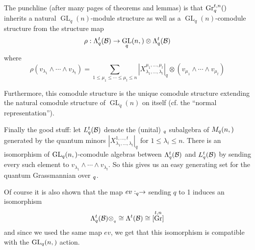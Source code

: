 \documentclass[12pt]{article}
\DeclareMathOperator{\Gr}{Gr}
\DeclareMathOperator{\GL}{GL}
\let\k\relax
\newcommand{\k}{\mathbbm{k}}
\begin{document}
The punchline (after many pages of theorems and lemmas) is that $\Gr_q^{t,n}(\k)$ inherits a natural $\GL_q(n)$-module structure as well as a $\GL_q(n)$-comodule structure 
from the structure map 
\[\rho:\Lambda_q^t(\calB)\to \GL_q(n,\k)\otimes \Lambda_q^t(\calB)\]
where 
\[\rho(v_{\lambda_1}\wedge\cdots\wedge v_{\lambda_t})=\sum_{1\le \mu_1\le\cdots\le \mu_t\le n}|X^{\mu_1,\dots,\mu_t}_{\lambda_1,\dots,\lambda_t}|_q\otimes(v_{\mu_1}\wedge\cdots\wedge v_{\mu_t})\]

Furthermore, this comodule structure is the unique comodule structure extending the natural comodule structure of $\GL_q(n)$ on itself (cf. the ``normal representation'').

Finally the good stuff: let $L_q^t(\mathcal{B})$ denote the (unital) $\k_q$ subalgebra of $M_q(n,\k)$ generated 
by the quantum minors $|X^{1,\dots,t}_{\lambda_1,\dots,\lambda_t}|_q$ for $1\le \lambda_i\le n$. There is an isomorphism of $\GL_q(n,\k)$-comodule algebras 
between $\Lambda^t_q(\mathcal{B})$ and $L^t_q(\mathcal{B})$ by sending every such element to $v_{\lambda_1}\wedge\cdots\wedge v_{\lambda_t}$. So this gives us an easy generating set 
for the quantum Grassmannian over $\k_q$.

Of course it is also shown that the map $ev:\k_q\to \k$ sending $q$ to 1 induces an isomorphism 
\[\Lambda_q^t(\calB)\otimes_{\k_q}\k\cong \Lambda^t(\calB)\cong \k[\Gr^{t,n}]\]
and since we used the same map $ev$, we get that this isomorphism is compatible with the $\GL_q(n,\k)$ action.
\medskip

\printbibliography
\end{document}
